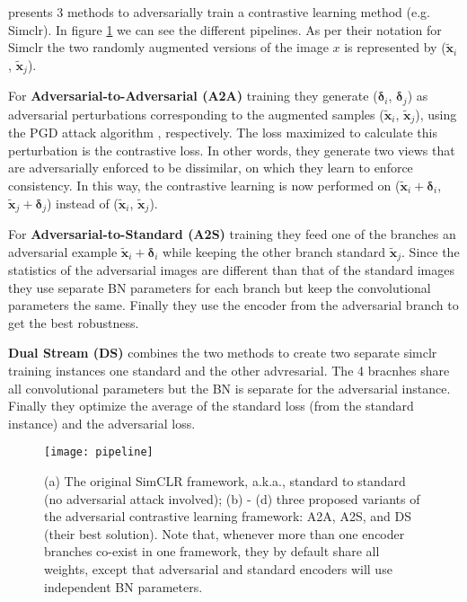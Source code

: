 \documentclass[../thesis.tex]{subfiles}
\begin{document}
	\cite{ACL_Adversarial_Contrastive_Learning_2020} presents 3 methods to adversarially train a contrastive learning method (e.g. Simclr). In figure \ref{fig:ACL_methods} we can see the different pipelines. As per their notation for Simclr the two randomly augmented versions of the image $x$ is represented by ($\tilde{\boldsymbol{x}}_{i}$, $\tilde{\boldsymbol{x}}_{j}$). 
	
	For \textbf{Adversarial-to-Adversarial (A2A)} training they generate ($\boldsymbol{\delta}_i$, $\boldsymbol{\delta}_j$) as adversarial perturbations corresponding to the augmented samples ($\tilde{\boldsymbol{x}}_{i}$, $\tilde{\boldsymbol{x}}_{j}$), using the PGD attack algorithm , respectively. The loss maximized to calculate this perturbation is the contrastive loss. In other words, they generate two views that are adversarially enforced to be dissimilar, on which they learn to enforce consistency. In this way, the contrastive learning is now performed on ($\tilde{\boldsymbol{x}}_{i} + \boldsymbol{\delta}_i$, $\tilde{\boldsymbol{x}}_{j} + \boldsymbol{\delta}_j$) instead of ($\tilde{\boldsymbol{x}}_{i}$, $\tilde{\boldsymbol{x}}_{j}$).
	
	For \textbf{Adversarial-to-Standard (A2S)} training they feed one of the branches an adversarial example $\tilde{\boldsymbol{x}}_{i} + \boldsymbol{\delta}_i$ while keeping the other branch standard $\tilde{\boldsymbol{x}}_{j}$. Since the statistics of the adversarial images are different than that of the standard images they use separate BN parameters for each branch but keep the convolutional parameters the same. Finally they use the encoder from the adversarial branch to get the best robustness. 
	
	\textbf{Dual Stream (DS)} combines the two methods to create two separate simclr training instances one standard and the other advresarial. The 4 bracnhes share all convolutional parameters but the BN is separate for the adversarial instance. Finally they optimize the average of the standard loss (from the standard instance) and the adversarial loss. 
	
	\begin{figure}[h!]
		\centering
		\texttt{[image: pipeline]}
		\caption{(a) The original SimCLR framework, a.k.a., standard to standard (no adversarial attack involved); (b) - (d) three proposed variants of the adversarial
			contrastive learning framework: A2A, A2S, and DS (their best solution). Note that, whenever more
			than one encoder branches co-exist in one framework, they by default share all weights, except that
			adversarial and standard encoders will use independent BN parameters.}
		\label{fig:ACL_methods}
	\end{figure}
	
\end{document}
